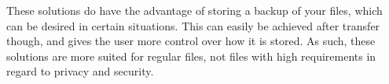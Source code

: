   These solutions do have the advantage of storing a backup of your files, which can be desired in certain situations. This can easily be achieved after transfer though, and gives the user more control over how it is stored. As such, these solutions are more suited for regular files, not files with high requirements in regard to privacy and security.
%